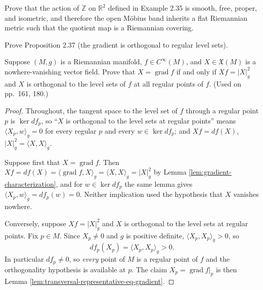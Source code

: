 \begin{exercise}\label{prob:mobius-band-metric}
Prove that the action of $\mathbb{Z}$ on $\mathbb{R}^2$ defined in Example 2.35 is smooth, free, proper, and isometric, and therefore the open Möbius band inherits a flat Riemannian metric such that the quotient map is a Riemannian covering.
\end{exercise}

\begin{exercise}\label{prob:gradient-orthogonal-level-sets}
\leanok
{}
Prove Proposition 2.37 (the gradient is orthogonal to regular level sets).
\end{exercise}

\begin{exercise}\label{prob:gradient-characterization}
\leanok
{}
Suppose $(M,g)$ is a Riemannian manifold, $f \in C^\infty(M)$, and $X \in \mathfrak{X}(M)$ is a nowhere-vanishing vector field. Prove that $X = \operatorname{grad} f$ if and only if $Xf = |X|_g^2$ and $X$ is orthogonal to the level sets of $f$ at all regular points of $f$. (Used on pp.~161, 180.)
\end{exercise}

\begin{proof}
\leanok
Throughout, the tangent space to the level set of $f$ through a regular point $p$ is $\ker df_p$, so ``$X$ is orthogonal to the level sets at regular points'' means $\langle X_p, w\rangle_g = 0$ for every regular $p$ and every $w \in \ker df_p$; and $Xf = df(X)$, $|X|_g^2 = \langle X, X\rangle_g$.

Suppose first that $X = \operatorname{grad} f$. Then $Xf = df(X) = \langle \operatorname{grad} f, X\rangle_g = \langle X, X\rangle_g = |X|_g^2$ by Lemma \ref{lem:gradient-characterization}, and for $w \in \ker df_p$ the same lemma gives $\langle X_p, w\rangle_g = df_p(w) = 0$. Neither implication used the hypothesis that $X$ vanishes nowhere.

Conversely, suppose $Xf = |X|_g^2$ and $X$ is orthogonal to the level sets at regular points. Fix $p \in M$. Since $X_p \neq 0$ and $g$ is positive definite, $\langle X_p, X_p\rangle_g > 0$, so
\[
df_p(X_p) = \langle X_p, X_p \rangle_g > 0 .
\]
In particular $df_p \neq 0$, so \emph{every} point of $M$ is a regular point of $f$ and the orthogonality hypothesis is available at $p$. The claim $X_p = \operatorname{grad} f|_p$ is then Lemma \ref{lem:transversal-representative-eq-gradient}.
\end{proof}

